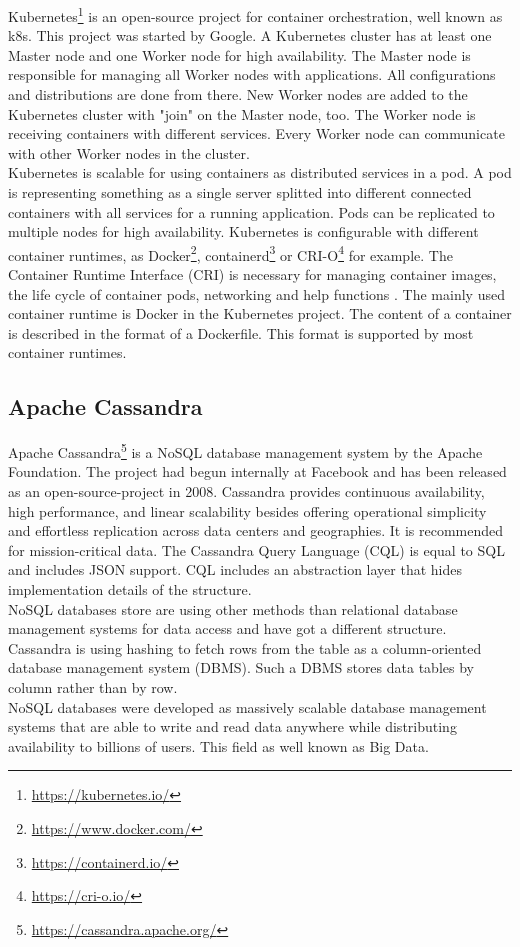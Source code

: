 Kubernetes\footnote{\url{https://kubernetes.io/}} is an open-source project for container orchestration, well known as k8s. This project was started by Google. A Kubernetes cluster has at least one Master node and one Worker node for high availability. The Master node is responsible for managing all Worker nodes with applications. All configurations and distributions are done from there. New Worker nodes are added to the Kubernetes cluster with "join" on the Master node, too. The Worker node is receiving containers with different services. Every Worker node can communicate with other Worker nodes in the cluster. \\
Kubernetes is scalable for using containers as distributed services in a pod. A pod is representing something as a single server splitted into different connected containers with all services for a running application. Pods can be replicated to multiple nodes for high availability. Kubernetes is configurable with different container runtimes, as Docker\footnote{\url{https://www.docker.com/}}, containerd\footnote{\url{https://containerd.io/}} or CRI-O\footnote{\url{https://cri-o.io/}} for example. The Container Runtime Interface (CRI) is necessary for managing container images, the life cycle of container pods, networking and help functions \cite[~p.16]{Scholl2019}. The mainly used container runtime is Docker in the Kubernetes project. The content of a container is described in the format of a Dockerfile. This format is supported by most container runtimes.


\subsection{Apache Cassandra}

Apache Cassandra\footnote{\url{https://cassandra.apache.org/}} is a NoSQL database management system by the Apache Foundation. The project had begun internally at Facebook and has been released as an open-source-project in 2008. Cassandra provides continuous availability, high performance, and linear scalability besides  offering operational simplicity and effortless replication across data centers and geographies\cite{Datastax}. It is recommended for mission-critical data. The Cassandra Query Language (CQL) is equal to SQL and includes JSON support. CQL includes an abstraction layer that hides implementation details of the structure.  \\
NoSQL databases store are using other methods than relational database management systems for data access and have got a different structure. Cassandra is using hashing to fetch rows from the table as a column-oriented database management system (DBMS). Such a DBMS stores data tables by column rather than by row. \\ 
NoSQL databases were developed as massively scalable database management systems that are able to write and read data anywhere while distributing availability to billions of users. This field as well known as Big Data.